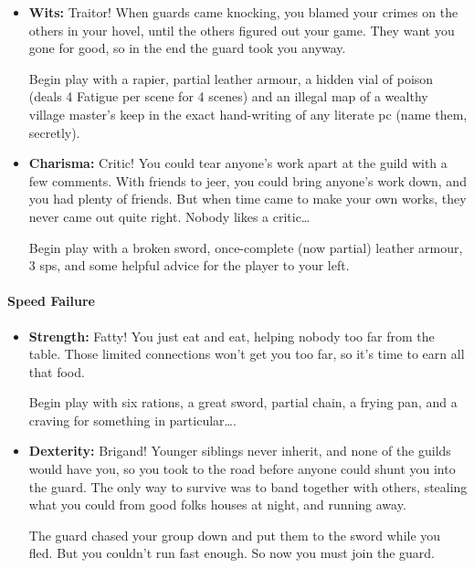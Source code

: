 {\begin{multicols}{2}
\begin{itemize}
  Begin play with a bag of flour, a bag of chalk, a shortsword, a dagger, and an unopened letter from home.

  \item
  \textbf{Wits:}
  Traitor!
  When guards came knocking, you blamed your crimes on the others in your hovel, until the others figured out your game.
  They want you gone for good, so in the end the \gls{guard} took you anyway.

  Begin play with a rapier, partial leather armour, a hidden vial of poison (deals 4 Fatigue per scene for 4 scenes) and an illegal map of a wealthy village master's keep in the exact hand-writing of any literate \gls{pc} (name them, secretly).
  \item
  \textbf{Charisma:}
  Critic!
  You could tear anyone's work apart at the guild with a few comments.
  With friends to jeer, you could bring anyone's work down, and you had plenty of friends.
  But when time came to make your own works, they never came out quite right.
  Nobody likes a critic\ldots
  
  Begin play with a broken sword, once-complete (now partial) leather armour, 3 \glspl{sp}, and some helpful advice for the player to your left.

\end{itemize}

\paragraph{Speed Failure}

\begin{itemize}

  \item
  \textbf{Strength:}
  Fatty!
  You just eat and eat, helping nobody too far from the table.
  Those limited connections won't get you too far, so it's time to earn all that food.

  Begin play with six rations, a great sword, partial chain, a frying pan, and a craving for something in particular\ldots.

  \item
  \textbf{Dexterity:}
  Brigand!
  Younger siblings never inherit, and none of the guilds would have you, so you took to the road before anyone could shunt you into the \gls{guard}.
  The only way to survive was to band together with others, stealing what you could from good folks houses at night, and running away.

  The \gls{guard} chased your group down and put them to the sword while you fled.
  But you couldn't run fast enough.
  So now you must join the guard.


\end{itemize}
\end{multicols}}
